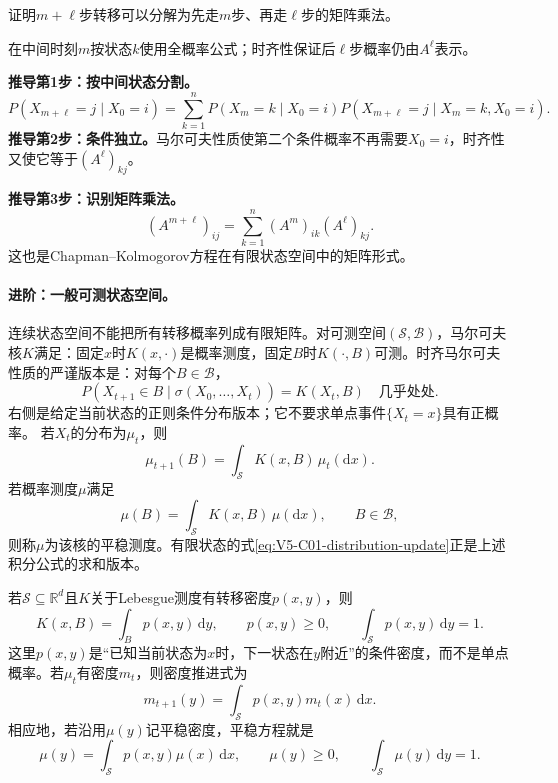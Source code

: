 
\begin{derivationgoalbox}
证明$m+\ell$步转移可以分解为先走$m$步、再走$\ell$步的矩阵乘法。
\end{derivationgoalbox}
\begin{derivationprepbox}
在中间时刻$m$按状态$k$使用全概率公式；时齐性保证后$\ell$步概率仍由$A^\ell$表示。
\end{derivationprepbox}
\textbf{推导第1步：按中间状态分割。}
\[
P(X_{m+\ell}=j\mid X_0=i)
=\sum_{k=1}^nP(X_m=k\mid X_0=i)
P(X_{m+\ell}=j\mid X_m=k,X_0=i).
\]
\textbf{推导第2步：条件独立。}马尔可夫性质使第二个条件概率不再需要$X_0=i$，时齐性又使它等于$(A^\ell)_{kj}$。

\textbf{推导第3步：识别矩阵乘法。}
\begin{equation}\label{eq:V5-C01-chapman-kolmogorov}
(A^{m+\ell})_{ij}=\sum_{k=1}^n(A^m)_{ik}(A^\ell)_{kj}.
\end{equation}
这也是Chapman--Kolmogorov方程在有限状态空间中的矩阵形式。

\paragraph{进阶：一般可测状态空间。}
连续状态空间不能把所有转移概率列成有限矩阵。对可测空间$(\mathcal S,\mathcal B)$，马尔可夫核$K$满足：固定$x$时$K(x,\cdot)$是概率测度，固定$B$时$K(\cdot,B)$可测。时齐马尔可夫性质的严谨版本是：对每个$B\in\mathcal B$，
\[
P(X_{t+1}\in B\mid\sigma(X_0,\ldots,X_t))
=K(X_t,B)\quad\text{几乎处处}.
\]
右侧是给定当前状态的正则条件分布版本；它不要求单点事件$\{X_t=x\}$具有正概率。
若$X_t$的分布为$\mu_t$，则
\begin{equation}\label{eq:V5-C01-kernel-update}
\mu_{t+1}(B)=\int_{\mathcal S}K(x,B)\,\mu_t(\mathrm dx).
\end{equation}
若概率测度$\mu$满足
\[
\mu(B)=\int_{\mathcal S}K(x,B)\,\mu(\mathrm dx),\qquad B\in\mathcal B,
\]
则称$\mu$为该核的平稳测度。有限状态的式\eqref{eq:V5-C01-distribution-update}正是上述积分公式的求和版本。

若$\mathcal S\subseteq\mathbb R^d$且$K$关于Lebesgue测度有转移密度$p(x,y)$，则
\begin{equation}\label{eq:V5-C01-transition-density}
K(x,B)=\int_Bp(x,y)\,\mathrm dy,
\qquad p(x,y)\ge0,
\qquad\int_{\mathcal S}p(x,y)\,\mathrm dy=1.
\end{equation}
这里$p(x,y)$是“已知当前状态为$x$时，下一状态在$y$附近”的条件密度，而不是单点概率。若$\mu_t$有密度$m_t$，则密度推进式为
\[
m_{t+1}(y)=\int_{\mathcal S}p(x,y)m_t(x)\,\mathrm dx.
\]
相应地，若沿用$\mu(y)$记平稳密度，平稳方程就是
\begin{equation}\label{eq:V5-C01-stationary-density}
\mu(y)=\int_{\mathcal S}p(x,y)\mu(x)\,\mathrm dx,
\qquad \mu(y)\ge0,
\qquad\int_{\mathcal S}\mu(y)\,\mathrm dy=1.
\end{equation}

